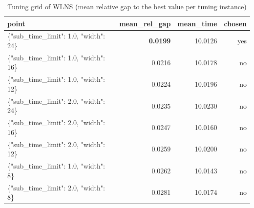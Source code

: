 \begin{table}[htbp]
\centering
\small
\caption{Tuning grid of WLNS (mean relative gap to the best value per tuning instance)}
\label{tab:E8b_tuning_budget_WLNS}
\begin{tabular}{lrrr}
\toprule
point & mean\_rel\_gap & mean\_time & chosen \\
\midrule
\{"sub\_time\_limit": 1.0, "width": 24\} & \textbf{0.0199} & 10.0126 & yes \\
\{"sub\_time\_limit": 1.0, "width": 16\} & 0.0216 & 10.0178 & no \\
\{"sub\_time\_limit": 1.0, "width": 12\} & 0.0224 & 10.0196 & no \\
\{"sub\_time\_limit": 2.0, "width": 24\} & 0.0235 & 10.0230 & no \\
\{"sub\_time\_limit": 2.0, "width": 16\} & 0.0247 & 10.0160 & no \\
\{"sub\_time\_limit": 2.0, "width": 12\} & 0.0259 & 10.0200 & no \\
\{"sub\_time\_limit": 1.0, "width": 8\} & 0.0262 & 10.0143 & no \\
\{"sub\_time\_limit": 2.0, "width": 8\} & 0.0281 & 10.0174 & no \\
\bottomrule
\end{tabular}
\end{table}
